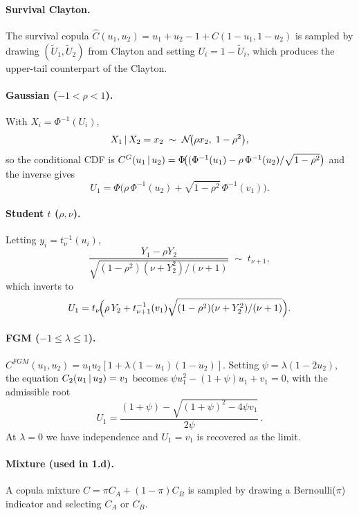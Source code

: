 \paragraph{Survival Clayton.} The survival copula
$\hat C(u_1,u_2)=u_1+u_2-1+C(1-u_1,1-u_2)$ is sampled by drawing
$(\tilde U_1,\tilde U_2)$ from Clayton and setting
$U_i=1-\tilde U_i$, which produces the upper-tail counterpart of the Clayton.

\paragraph{Gaussian ($-1<\rho<1$).}
With $X_i=\Phi^{-1}(U_i)$,
\[
X_1\,|\, X_2=x_2\;\sim\;\mathcal{N}\!\bigl(\rho x_2,\;1-\rho^2\bigr),
\]
so the conditional CDF is $C^G(u_1\,|\, u_2)=
\Phi\!\bigl((\Phi^{-1}(u_1)-\rho\,\Phi^{-1}(u_2)/\sqrt{1-\rho^2}\bigr)$
and the inverse gives
\begin{equation}\label{eq:gauss-sim}
U_1=\Phi\!\bigl(\rho\,\Phi^{-1}(u_2)+\sqrt{1-\rho^2}\,\Phi^{-1}(v_1)\bigr).
\end{equation}

\paragraph{Student $t$ ($\rho,\nu$).} Letting $y_i=t_\nu^{-1}(u_i)$,
\[
\frac{\,Y_1-\rho Y_2\,}{\sqrt{(1-\rho^2)(\nu+Y_2^2)/(\nu+1)}}\;\sim\;t_{\nu+1},
\]
which inverts to
\begin{equation}\label{eq:t-sim}
U_1=t_\nu\!\Bigl(\rho\, Y_2+t_{\nu+1}^{-1}(v_1)\sqrt{(1-\rho^2)(\nu+Y_2^2)/(\nu+1)}\Bigr).
\end{equation}

\paragraph{FGM ($-1\le\lambda\le 1$).}
$C^{FGM}(u_1,u_2)=u_1u_2[1+\lambda(1-u_1)(1-u_2)]$. Setting
$\psi=\lambda(1-2u_2)$, the equation $C_2(u_1\,|\, u_2)=v_1$ becomes
$\psi u_1^2-(1+\psi)u_1+v_1=0$, with the admissible root
\begin{equation}\label{eq:fgm-sim}
U_1=\frac{(1+\psi)-\sqrt{(1+\psi)^2-4\psi v_1}}{2\psi}\,.
\end{equation}
At $\lambda=0$ we have independence and $U_1=v_1$ is recovered as the limit.

\paragraph{Mixture (used in 1.d).} A copula mixture
$C=\pi C_A+(1-\pi)C_B$ is sampled by drawing a Bernoulli($\pi$) indicator
and selecting $C_A$ or $C_B$.

